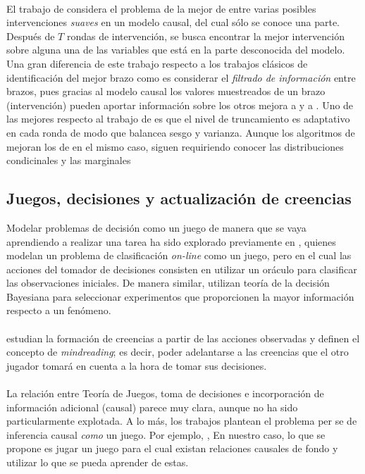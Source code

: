 \documentclass[11pt]{article}
\theoremstyle{plain}
\begin{document}
\\
\indent El trabajo de \cite{sen2017identifying} considera el problema de la mejor de entre varias posibles intervenciones \textit{suaves} en un modelo causal, del cual sólo se conoce una parte. Después de $T$ rondas de intervención, se busca encontrar la mejor intervención sobre alguna una de las variables que está en la parte desconocida del modelo. Una gran diferencia de este trabajo respecto a los trabajos clásicos de identificación del mejor brazo como \cite{audibert2010best} es considerar el \textit{filtrado de información} entre brazos, pues gracias al modelo causal los valores muestreados de un brazo (intervención) pueden aportar información sobre los otros
mejora a \cite{lattimoreNIPS2016} y a \cite{audibert2010best}. Uno de las mejores respecto al trabajo de \cite{lattimoreNIPS2016} es que el nivel de truncamiento es adaptativo en cada ronda de modo que balancea sesgo y varianza. Aunque los algoritmos de \cite{sen2017identifying} mejoran los de \cite{lattimoreNIPS2016} en el mismo caso, siguen requiriendo conocer las distribuciones condicinales y las marginales
\subsection{Juegos, decisiones y actualización de creencias}
\indent Modelar problemas de decisión como un juego de manera que se vaya aprendiendo a realizar una tarea ha sido explorado previamente en \cite{werling2015job}, quienes modelan un problema de clasificación \textit{on-line} como un juego, pero en el cual las acciones del tomador de decisiones consisten en utilizar un oráculo para clasificar las observaciones iniciales. De manera similar, \cite{javdani2014near} utilizan teoría de la decisión Bayesiana para seleccionar experimentos que proporcionen la mayor información respecto a un fenómeno.\\
\\
\indent \cite{larrouy2017mindreading} estudian la formación de creencias a partir de las acciones observadas y definen el concepto de \textit{mindreading}; es decir, poder adelantarse a las creencias que el otro jugador tomará en cuenta a la hora de tomar sus decisiones.\\
\\
\indent La relación entre Teoría de Juegos, toma de decisiones e incorporación de información adicional (causal) parece muy clara, aunque no ha sido particularmente explotada. A lo más, los trabajos plantean el problema per se de inferencia causal \textit{como} un juego. Por ejemplo, \cite{heckerman1995decision}, \cite{eberhardt2008causal}  En nuestro caso, lo que se propone es jugar un juego para el cual existan relaciones causales de fondo y utilizar lo que se pueda aprender de estas.
\\
\cite{di2013predictive}
\\
\cite{tingley2010belief}
\\
\cite{10.1007/978-94-010-0189-2_25}
\\
\cite{harper1988causal}
\end{document}

